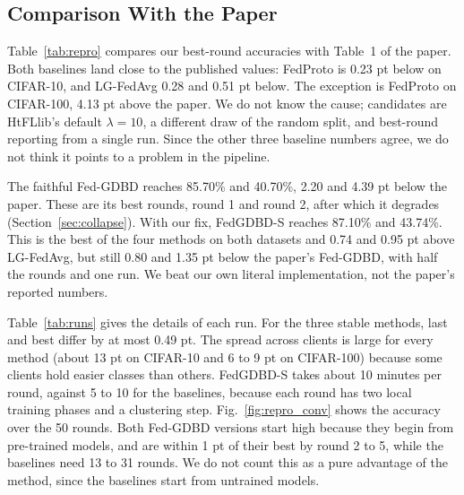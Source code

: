 \documentclass[conference]{IEEEtran}
\begin{document}
\subsection{Comparison With the Paper}
Table~\ref{tab:repro} compares our best-round accuracies with Table~1 of the paper. Both baselines land close to the published values: FedProto is 0.23 pt below on CIFAR-10, and LG-FedAvg 0.28 and 0.51 pt below. The exception is FedProto on CIFAR-100, 4.13 pt above the paper. We do not know the cause; candidates are HtFLlib's default $\lambda=10$, a different draw of the random split, and best-round reporting from a single run. Since the other three baseline numbers agree, we do not think it points to a problem in the pipeline.

The faithful Fed-GDBD reaches 85.70\% and 40.70\%, 2.20 and 4.39 pt below the paper. These are its best rounds, round 1 and round 2, after which it degrades (Section~\ref{sec:collapse}). With our fix, FedGDBD-S reaches 87.10\% and 43.74\%. This is the best of the four methods on both datasets and 0.74 and 0.95 pt above LG-FedAvg, but still 0.80 and 1.35 pt below the paper's Fed-GDBD, with half the rounds and one run. We beat our own literal implementation, not the paper's reported numbers.

\begin{table}[t]
\centering
\caption{Best-round averaged test accuracy (\%) of our runs and the paper's, practical setting, 50 rounds, one run. $\Delta$ = ours $-$ paper. For FedGDBD-S the paper column repeats the paper's Fed-GDBD. $^\dagger$Best round before the collapse.}
\label{tab:repro}
\footnotesize
\setlength{\tabcolsep}{3.2pt}
\resizebox{\columnwidth}{!}{\TabReproMain}
\end{table}

Table~\ref{tab:runs} gives the details of each run. For the three stable methods, last and best differ by at most 0.49 pt. The spread across clients is large for every method (about 13 pt on CIFAR-10 and 6 to 9 pt on CIFAR-100) because some clients hold easier classes than others. FedGDBD-S takes about 10 minutes per round, against 5 to 10 for the baselines, because each round has two local training phases and a clustering step. Fig.~\ref{fig:repro_conv} shows the accuracy over the 50 rounds. Both Fed-GDBD versions start high because they begin from pre-trained models, and are within 1 pt of their best by round 2 to 5, while the baselines need 13 to 31 rounds. We do not count this as a pure advantage of the method, since the baselines start from untrained models.
\end{document}

